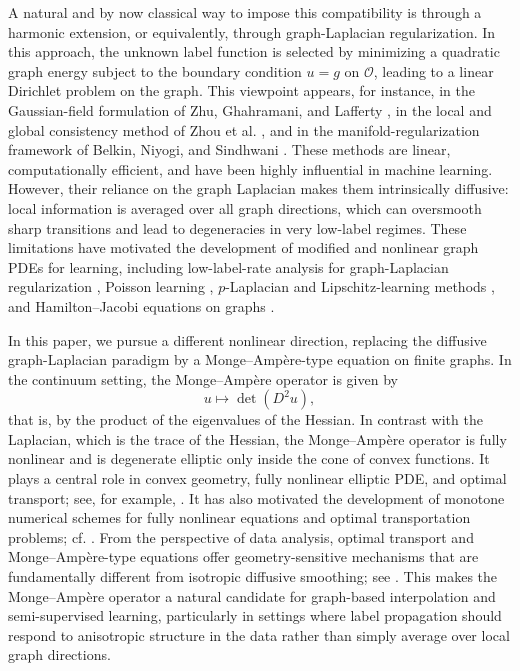 \documentclass[reqno,11pt]{amsart}
\numberwithin{equation}{section}
\theoremstyle{definition}
\theoremstyle{remark}
\begin{document}
A natural and by now classical way to impose this compatibility is through a harmonic extension, or equivalently, through graph-Laplacian regularization. In this approach, the unknown label function is selected by minimizing a quadratic graph energy subject to the boundary condition \(u=g\) on \(\mathcal O\), leading to a linear Dirichlet problem on the graph. This viewpoint appears, for instance, in the Gaussian-field formulation of Zhu, Ghahramani, and Lafferty \cite{ZhuGhahramaniLafferty2003}, in the local and global consistency method of Zhou et al. \cite{ZhouBousquetLalWestonScholkopf2004}, and in the manifold-regularization framework of Belkin, Niyogi, and Sindhwani \cite{BelkinNiyogiSindhwani2006}. These methods are linear, computationally efficient, and have been highly influential in machine learning. However, their reliance on the graph Laplacian makes them intrinsically diffusive: local information is averaged over all graph directions, which can oversmooth sharp transitions and lead to degeneracies in very low-label regimes. These limitations have motivated the development of modified and nonlinear graph PDEs for learning, including low-label-rate analysis for graph-Laplacian regularization \cite{NadlerSrebroZhou2009, CalderSlepcevThorpe2023}, Poisson learning \cite{CalderCookThorpeSlepcev2020}, \(p\)-Laplacian and Lipschitz-learning methods \cite{ElAlaouiChengRamdasWainwrightJordan2016, SlepcevThorpe2019, Calder2019Game, Calder2019Lipschitz, FloresCalderLerman2022}, and Hamilton--Jacobi equations on graphs \cite{CalderEttehad2022}.

In this paper, we pursue a different nonlinear direction, replacing the diffusive graph-Laplacian paradigm by a Monge--Amp\`ere-type equation on finite graphs. In the continuum setting, the Monge--Amp\`ere operator is given by
\[
    u \longmapsto \det(D^2 u),
\]
that is, by the product of the eigenvalues of the Hessian. In contrast with the Laplacian, which is the trace of the Hessian, the Monge--Amp\`ere operator is fully nonlinear and is degenerate elliptic only inside the cone of convex functions. It plays a central role in convex geometry, fully nonlinear elliptic PDE, and optimal transport; see, for example, \cite{Gutierrez2016}. It has also motivated the development of monotone numerical schemes for fully nonlinear equations and optimal transportation problems; cf. \cite{Oberman2008, FroeseOberman2011, BenamouFroeseOberman2014}. From the perspective of data analysis, optimal transport and Monge--Amp\`ere-type equations offer geometry-sensitive mechanisms that are fundamentally different from isotropic diffusive smoothing; see \cite{PeyreCuturi2019}. This makes the Monge--Amp\`ere operator a natural candidate for graph-based interpolation and semi-supervised learning, particularly in settings where label propagation should respond to anisotropic structure in the data rather than simply average over local graph directions.
\end{document}

